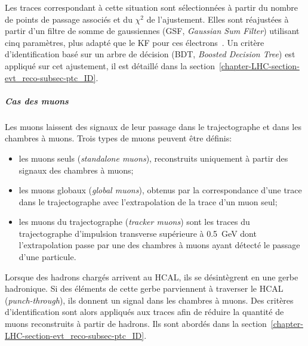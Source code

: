 Les traces correspondant à cette situation sont sélectionnées à partir du nombre de points de passage associés et du $\chi^2$ de l'ajustement.
Elles sont réajustées à partir d'un filtre de somme de gaussiennes (GSF, \emph{Gaussian Sum Filter}) \cite{GSF} utilisant cinq paramètres, plus adapté que le KF pour ces électrons~\cite{particle-flow}.
Un critère d'identification basé sur un arbre de décision (BDT, \emph{Boosted Decision Tree}) est appliqué sur cet ajustement, il est détaillé dans la section~\ref{chapter-LHC-section-evt_reco-subsec-ptc_ID}.
\subparagraph{Cas des muons}
Les muons laissent des signaux de leur passage dans le trajectographe et dans les chambres à muons.
Trois types de muons peuvent être définis:
\begin{itemize}
\item les muons seuls (\emph{standalone muons}), reconstruits uniquement à partir des signaux des chambres à muons;
\item les muons globaux (\emph{global muons}), obtenus par la correspondance d'une trace dans le trajectographe avec l'extrapolation de la trace d'un muon seul;
\item les muons du trajectographe (\emph{tracker muons}) sont les traces du trajectographe d'impulsion transverse supérieure à \SI{0.5}{\GeV} dont l'extrapolation passe par une des chambres à muons ayant détecté le passage d'une particule.
\end{itemize}
\par
Lorsque des hadrons chargés arrivent au HCAL, ils se désintègrent en une gerbe hadronique.
Si des éléments de cette gerbe parviennent à traverser le HCAL (\emph{punch-through}), ils donnent un signal dans les chambres à muons.
Des critères d'identification sont alors appliqués aux traces afin de réduire la quantité de muons reconstruits à partir de hadrons.
Ils sont abordés dans la section~\ref{chapter-LHC-section-evt_reco-subsec-ptc_ID}.
